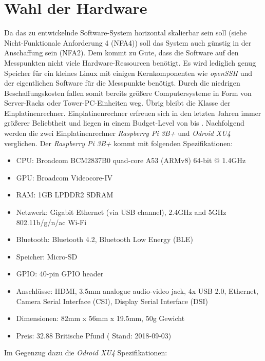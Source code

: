 \documentclass[titlepage]{report}
\begin{document}
\section*{Wahl der Hardware}
Da das zu entwickelnde Software\hyp{}System horizontal skalierbar sein soll (siehe
Nicht-Funktionale Anforderung 4 (NFA4)) soll das System auch günstig in
der Anschaffung sein (NFA2). Dem kommt zu Gute, dass die Software auf den
Messpunkten nicht viele Hardware\hyp{}Ressourcen benötigt. Es wird
lediglich genug Speicher für ein kleines Linux mit einigen
Kernkomponenten wie \emph{openSSH} und der eigentlichen Software für die
Messpunkte benötigt. Durch die niedrigen Beschaffungskosten fallen somit
bereits größere Computersysteme in Form von Server\hyp{}Racks oder
Tower\hyp{}PC\hyp{}Einheiten weg. Übrig bleibt die Klasse der
Einplatinenrechner. Einplatinenrechner erfreuen sich in den letzten
Jahren immer größerer Beliebtheit und liegen in einem Budget\hyp{}Level
von  bis . Nachfolgend werden die zwei Einplatinenrechner
\emph{Raspberry Pi 3B+} und \emph{Odroid XU4} verglichen.
Der \emph{Raspberry Pi 3B+} kommt mit folgenden Spezifikationen\cite{RASPI}:
\begin{itemize}
    \item CPU: Broadcom BCM2837B0 quad-core A53 (ARMv8) 64-bit @ 1.4GHz
    \item GPU: Broadcom Videocore-IV
    \item RAM: 1GB LPDDR2 SDRAM
    \item Netzwerk: Gigabit Ethernet (via USB channel), 2.4GHz and 5GHz 802.11b/g/n/ac Wi-Fi
    \item Bluetooth: Bluetooth 4.2, Bluetooth Low Energy (BLE)
    \item Speicher: Micro-SD
    \item GPIO: 40-pin GPIO header
    \item Anschlüsse: HDMI, 3.5mm analogue audio-video jack, 4x USB 2.0, Ethernet, Camera Serial Interface
        (CSI), Display Serial Interface (DSI)
    \item Dimensionen: 82mm x 56mm x 19.5mm, 50g Gewicht
    \item Preis: 32.88 Britische Pfund\cite{RASPI_PRICE} ( Stand: 2018-09-03)
\end{itemize}
Im Gegenzug dazu die \emph{Odroid XU4} Spezifikationen\cite{ODROID}:
\end{document}
